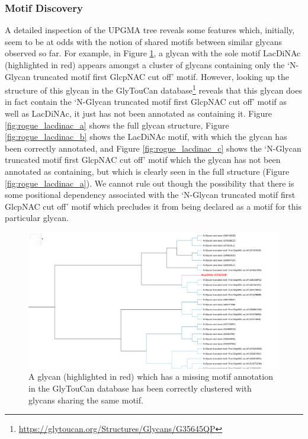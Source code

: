 \documentclass[12pt,a4paper]{article}
\begin{document}
\subsubsection{Motif Discovery}
A detailed inspection of the UPGMA tree reveals some features which, initially, seem to be at odds with the notion of shared motifs between similar glycans observed so far. For example, in Figure \ref{fig:full_tree_LacDiNAc}, a glycan with the sole motif LacDiNAc (highlighted in red) appears amongst a cluster of glycans containing only the `N-Glycan truncated motif first GlcpNAC cut off' motif. However, looking up the structure of this glycan in the GlyTouCan database\footnote{\url{https://glytoucan.org/Structures/Glycans/G35645QP}} reveals that this glycan does in fact contain the `N-Glycan truncated motif first GlcpNAC cut off' motif as well as LacDiNAc, it just has not been annotated as containing it. Figure \ref{fig:rogue_lacdinac_a} shows the full glycan structure, Figure \ref{fig:rogue_lacdinac_b} shows the LacDiNAc motif, with which the glycan has been correctly annotated, and Figure \ref{fig:rogue_lacdinac_c} shows the `N-Glycan truncated motif first GlcpNAC cut off' motif which the glycan has not been annotated as containing, but which is clearly seen in the full structure (Figure \ref{fig:rogue_lacdinac_a}). We cannot rule out though the possibility that there is some positional dependency associated with the `N-Glycan truncated motif first GlcpNAC cut off' motif which precludes it from being declared as a motif for this particular glycan.


\begin{figure}
\centering 
\includegraphics[scale=0.3]{trees/rogue_LacDiNAc_in_tree.png} 
\caption{A glycan (highlighted in red) which has a missing motif annotation in the GlyTouCan database has been correctly clustered with glycans sharing the same motif.}
\label{fig:full_tree_LacDiNAc}
\end{figure}
\clearpage
\end{document}
